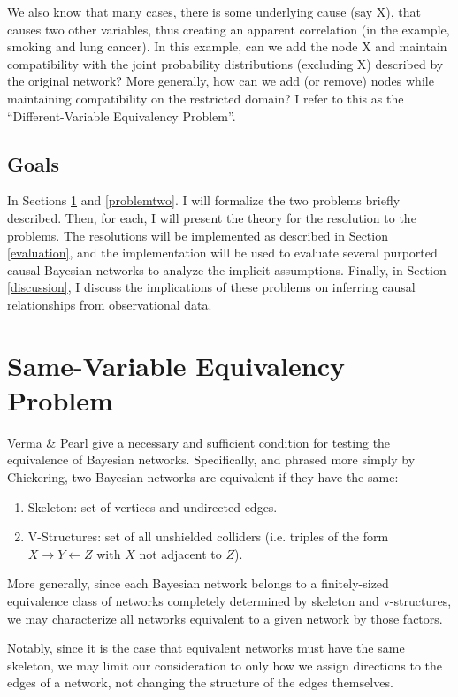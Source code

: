 \documentclass{article}
\newcommand{\problemone}{Same-Variable Equivalency Problem}
\newcommand{\problemtwo}{Different-Variable Equivalency Problem}
\begin{document}
	We also know that many cases, there is some underlying cause (say X), that causes two other variables, thus creating an apparent correlation (in the example, smoking and lung cancer). In this example, can we add the node X and maintain compatibility with the joint probability distributions (excluding X) described by the original network? More generally, how can we add (or remove) nodes while maintaining compatibility on the restricted domain? I refer to this as the ``\problemtwo''.
	
	\subsection{Goals}
	In Sections \ref{problemone} and \ref{problemtwo}. I will formalize the two problems briefly described.
	Then, for each, I will present the theory for the resolution to the problems.
	The resolutions will be implemented as described in Section \ref{evaluation}, and the implementation will be used to evaluate several purported causal Bayesian networks to analyze the implicit assumptions.
	Finally, in Section \ref{discussion}, I discuss the implications of these problems on inferring causal relationships from observational data.


	\section{\problemone}
	\label{problemone}
	
	Verma \& Pearl\cite{verma2013equivalence} give a necessary and sufficient condition for testing the equivalence of Bayesian networks.
	Specifically, and phrased more simply by Chickering\cite{chickering2013transformational}, two Bayesian networks are equivalent if they have the same:
	\begin{enumerate}
		\item Skeleton: set of vertices and undirected edges.
		\item V-Structures: set of all unshielded colliders (i.e. triples of the form $X \rightarrow Y \leftarrow Z$ with $X$ not adjacent to $Z$).
	\end{enumerate}
	More generally, since each Bayesian network belongs to a finitely-sized equivalence class of networks completely determined by skeleton and v-structures, we may characterize all networks equivalent to a given network by those factors.
	
	Notably, since it is the case that equivalent networks must have the same skeleton, we may limit our consideration to only how we assign directions to the edges of a network, not changing the structure of the edges themselves.
	
\end{document}

